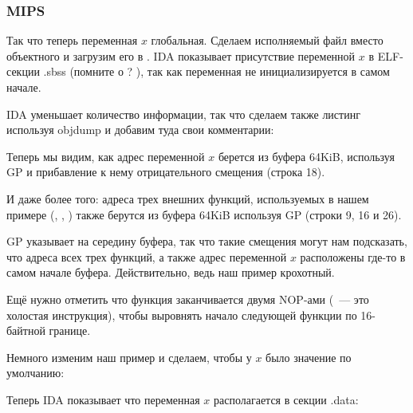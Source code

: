 \subsubsection{MIPS}


Так что теперь переменная $x$ глобальная.
Сделаем исполняемый файл вместо объектного и загрузим его в \IDA.
IDA показывает присутствие переменной $x$ в ELF-секции .sbss (помните о ? ),
так как переменная не инициализируется в самом начале.



IDA уменьшает количество информации, так что сделаем также листинг используя objdump и добавим туда свои комментарии:



Теперь мы видим, как адрес переменной $x$ берется из буфера 64KiB, используя GP и прибавление к нему отрицательного смещения (строка 18).

И даже более того: адреса трех внешних функций, используемых в нашем примере (\puts, \scanf, \printf)
также берутся из буфера 64KiB используя GP (строки 9, 16 и 26).

GP указывает на середину буфера, так что такие смещения могут нам подсказать, что адреса всех трех функций,
а также адрес переменной $x$ расположены где-то в самом начале буфера.
Действительно, ведь наш пример крохотный.

Ещё нужно отметить что функция заканчивается двумя \ac{NOP}-ами (~--- 
это холостая инструкция), чтобы выровнять начало следующей функции по 16-байтной границе.


Немного изменим наш пример и сделаем, чтобы у $x$ было значение по умолчанию:



Теперь IDA показывает что переменная $x$ располагается в секции .data:



